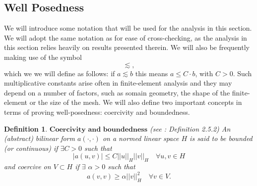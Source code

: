 \documentclass[12pt,a4paper]{article}
\newtheorem{definition}[theorem]{Definition}
\theoremstyle{definition}
\begin{document}
\subsection{Well Posedness}\label{sec_wellposed}
We will introduce some notation that will be used for the analysis in this section.  We will adopt the same notation as \cite{Chen2016} for ease of cross-checking, as the analysis in this section relies heavily on results presented therein. 
We will also be frequently making use of the symbol
\begin{equation}
	\lesssim \nonumber,
\end{equation}
which we we will define as follows: if $a\lesssim b$ this means $a\leq C\cdot b$, with $C>0$.  Such multiplicative constants arise often in finite-element analysis and they may depend on a number of factors, such as somain geometry, the shape of the finite-element or the size of the mesh.  We will also define two important concepts in terms of proving well-posedness: coercivity and boundedness.
\theoremstyle{definition}
\begin{definition}{$\textbf{Coercivity and boundedness}$} (see \cite{brenner2007mathematical}: Definition 2.5.2)
	An (abstract) bilinear form $a\left(\cdot,\cdot\right)$ on a normed linear space $H$ is said  to be bounded (or continuous) if $\exists C > 0$ such that
	\begin{equation}
		\left|a\left(u,v\right)\right|\leq C \left|\left|u\right|\right|_H\left|\left|v\right|\right|_H \quad \forall u,v \in H\nonumber
	\end{equation}
	and coercive on $V\subset H$ if $\exists$ $\alpha > 0$ such that
	\begin{equation}
	a\left(v,v\right)\geq \alpha \left|\left|v\right|\right|_H^2\quad \forall v \in V\nonumber.
	\end{equation}
\end{definition}
\end{document}
